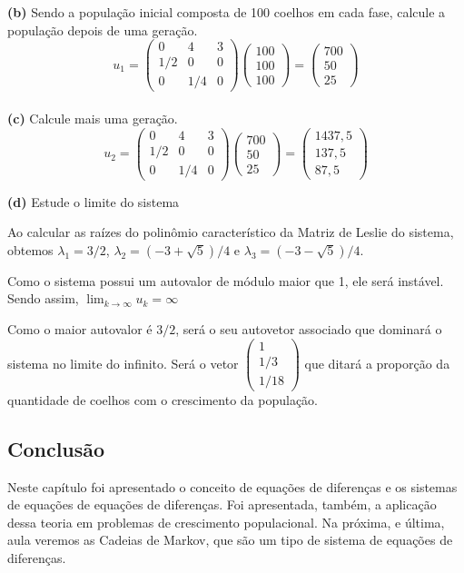\documentclass[12pt]{article}
\begin{document}
	\textbf{(b)} Sendo a população inicial composta de 100 coelhos em cada fase, calcule a população depois de uma geração.
	\begin{equation*}
		u_1=\begin{pmatrix}
			0 & 4 & 3 \\
			1/2 & 0 & 0 \\
			0 & 1/4 & 0
		\end{pmatrix}\begin{pmatrix}
			100 \\
			100 \\
			100
		\end{pmatrix}=\begin{pmatrix}
			700 \\
			50 \\
			25
		\end{pmatrix}
	\end{equation*}\\
	
	\textbf{(c)} Calcule mais uma geração.
	\begin{equation*}
		u_2=\begin{pmatrix}
			0 & 4 & 3 \\
			1/2 & 0 & 0 \\
			0 & 1/4 & 0
		\end{pmatrix}\begin{pmatrix}
			700 \\
			50 \\
			25
		\end{pmatrix}=\begin{pmatrix}
			1437,5 \\
			137,5 \\
			87,5
		\end{pmatrix}
	\end{equation*}
	
	\textbf{(d)} Estude o limite do sistema
	
	Ao calcular as raízes do polinômio característico da Matriz de Leslie do sistema, obtemos $\lambda_1=3/2$, $\lambda_2=(-3+\sqrt{5})/4$ e $\lambda_3=(-3-\sqrt{5})/4$.
	
	Como o sistema possui um autovalor de módulo maior que 1, ele será instável. Sendo assim, $\lim_{k\to\infty}u_k=\infty$
	
	Como o maior autovalor é $3/2$, será o seu autovetor associado que dominará o sistema no limite do infinito. Será o vetor $\begin{pmatrix}
		1 \\
		1/3 \\
		1/18
	\end{pmatrix}$ que ditará a proporção da quantidade de coelhos com o crescimento da população.
	
	\subsection{Conclusão}
	Neste capítulo foi apresentado o conceito de equações de diferenças e os sistemas de equações de equações de diferenças. Foi apresentada, também, a aplicação dessa teoria em problemas de crescimento populacional. Na próxima, e última, aula veremos as Cadeias de Markov, que são um tipo de sistema de equações de diferenças.
	
\end{document}

